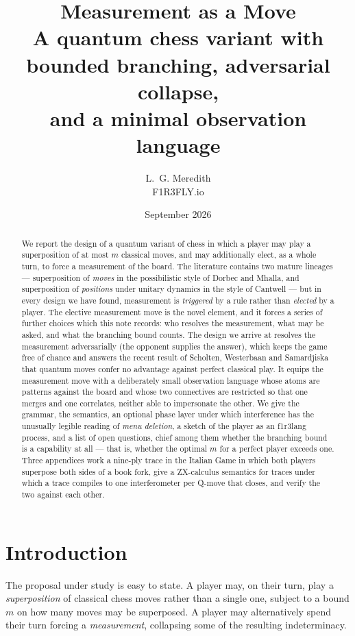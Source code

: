 \documentclass[11pt,a4paper]{article}
\title{Measurement as a Move\\[4pt]
\large A quantum chess variant with bounded branching, adversarial collapse,\\
and a minimal observation language}
\author{L.~G. Meredith\\ \small F1R3FLY.io}
\date{September 2026}
\theoremstyle{definition}
\theoremstyle{plain}
\begin{document}
\maketitle

\begin{abstract}
We report the design of a quantum variant of chess in which a player may play a
superposition of at most $m$ classical moves, and may additionally elect, as a
whole turn, to force a measurement of the board. The literature contains two
mature lineages --- superposition of \emph{moves} in the possibilistic style of
Dorbec and Mhalla, and superposition of \emph{positions} under unitary dynamics
in the style of Cantwell --- but in every design we have found, measurement is
\emph{triggered} by a rule rather than \emph{elected} by a player. The elective
measurement move is the novel element, and it forces a series of further
choices which this note records: who resolves the measurement, what may be
asked, and what the branching bound counts. The design we arrive at resolves
the measurement adversarially (the opponent supplies the answer), which keeps
the game free of chance and answers the recent result of Scholten, Westerbaan
and Samardjiska that quantum moves confer no advantage against perfect
classical play. It equips the measurement move with a deliberately small
observation language whose atoms are patterns against the board and whose two
connectives are restricted so that one merges and one correlates, neither able
to impersonate the other. We give the grammar, the semantics, an optional phase
layer under which interference has the unusually legible reading of
\emph{menu deletion}, a sketch of the player as an f1r3lang process, and a list
of open questions, chief among them whether the branching bound is a
capability at all --- that is, whether the optimal $m$ for a perfect player
exceeds one. Three appendices work a nine-ply trace in the Italian Game in which
both players superpose both sides of a book fork, give a ZX-calculus semantics
for traces under which a trace compiles to one interferometer per Q-move that
closes, and verify the two against each other.
\end{abstract}

\tableofcontents

\section{Introduction}
\label{sec:intro}

The proposal under study is easy to state. A player may, on their turn, play a
\emph{superposition} of classical chess moves rather than a single one, subject
to a bound $m$ on how many moves may be superposed. A player may alternatively
spend their turn forcing a \emph{measurement}, collapsing some of the resulting
indeterminacy.
\end{document}
